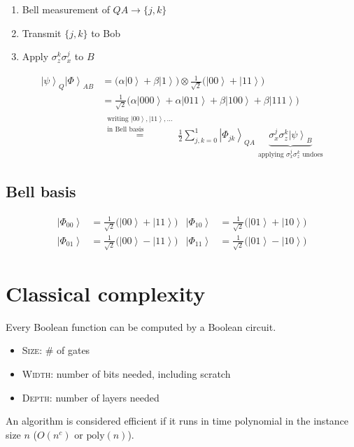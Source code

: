 \documentclass[11pt,a4paper]{article}
\renewcommand{\ket}[1]{\left|#1\right\rangle}
\begin{document}
\begin{enumerate}
  \item Bell measurement of $QA \to \{j,k\}$
  \item Transmit $\{j,k\}$ to Bob
  \item Apply $\sigma_z^k\sigma_x^j$ to $B$
\end{enumerate}
\begin{align*}
\ket{\psi}_Q\ket{\Phi}_{AB} &= \bigl(\alpha\ket0 + \beta\ket1\bigr)\otimes\tfrac{1}{\sqrt2}\bigl(\ket{00}+\ket{11}\bigr)\\
&= \tfrac{1}{\sqrt2}\bigl(\alpha\ket{000} + \alpha\ket{011} + \beta\ket{100} + \beta\ket{111}\bigr)\\
&\overset{\substack{\text{writing } \ket{00},\ket{11},\dots\\ \text{in Bell basis}}}{=}
\frac12\sum_{j,k=0}^{1}\ket{\Phi_{jk}}_{QA}\;\underbrace{\sigma_x^j\sigma_z^k\ket{\psi}_B}_{\text{applying }\sigma_x^j\sigma_z^k\text{ undoes}}
\end{align*}

\subsection*{Bell basis}
\begin{align*}
\ket{\Phi_{00}} &= \tfrac{1}{\sqrt2}\bigl(\ket{00}+\ket{11}\bigr) & \ket{\Phi_{10}} &= \tfrac{1}{\sqrt2}\bigl(\ket{01}+\ket{10}\bigr)\\
\ket{\Phi_{01}} &= \tfrac{1}{\sqrt2}\bigl(\ket{00}-\ket{11}\bigr) & \ket{\Phi_{11}} &= \tfrac{1}{\sqrt2}\bigl(\ket{01}-\ket{10}\bigr)
\end{align*}

\section{Classical complexity}

Every Boolean function can be computed by a Boolean circuit.
\begin{itemize}
  \item \textsc{Size}: \# of gates
  \item \textsc{Width}: number of bits needed, including scratch
  \item \textsc{Depth}: number of layers needed
\end{itemize}
An algorithm is considered efficient if it runs in time polynomial in the instance size $n$ ($O(n^c)$ or $\mathrm{poly}(n)$).
\end{document}
